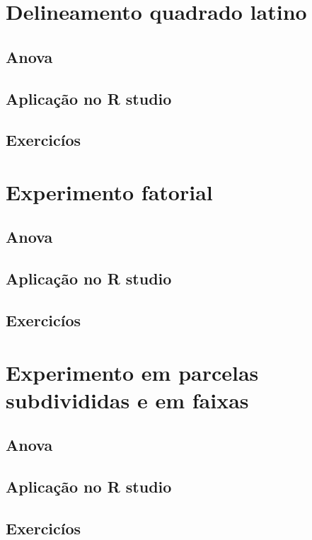 \documentclass[
]{book}
\begin{document}
\hypertarget{delineamento-quadrado-latino}{%
\chapter{Delineamento quadrado latino}\label{delineamento-quadrado-latino}}

\hypertarget{anova-2}{%
\section{Anova}\label{anova-2}}

\hypertarget{aplicauxe7uxe3o-no-r-studio-10}{%
\section{Aplicação no R studio}\label{aplicauxe7uxe3o-no-r-studio-10}}

\hypertarget{exercicuxedos-10}{%
\section{Exercicíos}\label{exercicuxedos-10}}

\hypertarget{experimento-fatorial}{%
\chapter{Experimento fatorial}\label{experimento-fatorial}}

\hypertarget{anova-3}{%
\section{Anova}\label{anova-3}}

\hypertarget{aplicauxe7uxe3o-no-r-studio-11}{%
\section{Aplicação no R studio}\label{aplicauxe7uxe3o-no-r-studio-11}}

\hypertarget{exercicuxedos-11}{%
\section{Exercicíos}\label{exercicuxedos-11}}

\hypertarget{experimento-em-parcelas-subdivididas-e-em-faixas}{%
\chapter{Experimento em parcelas subdivididas e em faixas}\label{experimento-em-parcelas-subdivididas-e-em-faixas}}

\hypertarget{anova-4}{%
\section{Anova}\label{anova-4}}

\hypertarget{aplicauxe7uxe3o-no-r-studio-12}{%
\section{Aplicação no R studio}\label{aplicauxe7uxe3o-no-r-studio-12}}

\hypertarget{exercicuxedos-12}{%
\section{Exercicíos}\label{exercicuxedos-12}}
\end{document}

